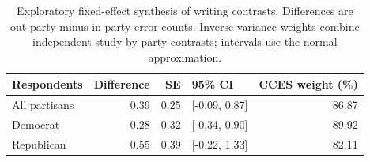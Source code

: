 \begin{table}[ht]
\centering
\caption{Exploratory fixed-effect synthesis of writing contrasts. Differences are out-party minus in-party error counts. Inverse-variance weights combine independent study-by-party contrasts; intervals use the normal approximation.}
\label{tab:pooled_writing}
\begin{tabular}{lrrlr}
  \toprule
Respondents & Difference & SE & 95\% CI & CCES weight (\%) \\
  \midrule
All partisans & 0.39 & 0.25 & [-0.09, 0.87] & 86.87 \\
  Democrat & 0.28 & 0.32 & [-0.34, 0.90] & 89.92 \\
  Republican & 0.55 & 0.39 & [-0.22, 1.33] & 82.11 \\
   \bottomrule
\end{tabular}
\end{table}
